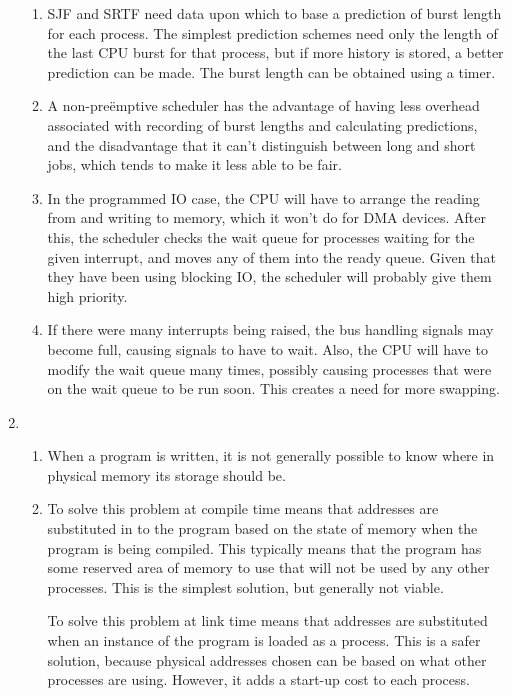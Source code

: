 \documentclass[11pt]{article}
\begin{document}
\begin{enumerate}
\begin{enumerate}
  \item SJF and SRTF need data upon which to base a prediction of burst length for each process. The simplest prediction schemes need only the length of the last CPU burst for that process, but if more history is stored, a better prediction can be made. The burst length can be obtained using a timer.
  \item A non-preëmptive scheduler has the advantage of having less overhead associated with recording of burst lengths and calculating predictions, and the disadvantage that it can't distinguish between long and short jobs, which tends to make it less able to be fair.
  \item In the programmed IO case, the CPU will have to arrange the reading from and writing to memory, which it won't do for DMA devices. After this, the scheduler checks the wait queue for processes waiting for the given interrupt, and moves any of them into the ready queue. Given that they have been using blocking IO, the scheduler will probably give them high priority.
  \item If there were many interrupts being raised, the bus handling signals may become full, causing signals to have to wait. Also, the CPU will have to modify the wait queue many times, possibly causing processes that were on the wait queue to be run soon. This creates a need for more swapping.
  \end{enumerate}
\item
  \begin{enumerate}
  \item When a program is written, it is not generally possible to know where in physical memory its storage should be.
  \item
    To solve this problem at compile time means that addresses are substituted in to the program based on the state of memory when the program is being compiled. This typically means that the program has some reserved area of memory to use that will not be used by any other processes. This is the simplest solution, but generally not viable.

    To solve this problem at link time means that addresses are substituted when an instance of the program is loaded as a process. This is a safer solution, because physical addresses chosen can be based on what other processes are using. However, it adds a start-up cost to each process.


\end{enumerate}
\end{enumerate}
\end{document}
